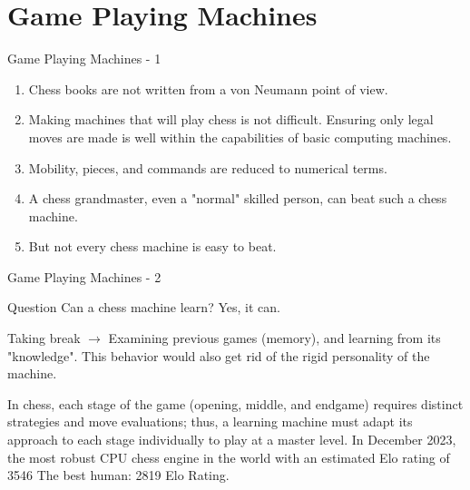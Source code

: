 \documentclass[xetex,notheorems,hyperref={pdfpagelabels=true},xcolor=table]{beamer}
\theoremstyle{plain}
\theoremstyle{definition}
\theoremstyle{example}
\theoremstyle{example}
\begin{document}
\section{Game Playing Machines}
\begin{frame}{Game Playing Machines - 1}
\begin{enumerate}[\indent $\square$]
    \item Chess books are not written from a von Neumann point of view.
    \item Making machines that will play chess is not difficult. Ensuring only legal moves are made is well within the capabilities of basic computing machines.
    \item Mobility, pieces, and commands are reduced to numerical terms.
    \item A chess grandmaster, even a "normal" skilled person, can beat such a chess machine. 
    \item But not every chess machine is easy to beat. 
\end{enumerate} 
\end{frame}

\begin{frame}{Game Playing Machines - 2}
\begin{block}{Question}
Can a chess machine learn? Yes, it can.
\end{block}
Taking break $\rightarrow$ Examining previous games (memory), and learning from its "knowledge".\vspace*{0.15cm}\newline
This behavior would also get rid of the rigid personality of the machine.\vspace*{0.15cm}\newline

In chess, each stage of the game (opening, middle, and endgame) requires distinct strategies and move evaluations; thus, a learning machine must adapt its approach to each stage individually to play at a master level.
\vspace*{0.25cm}\newline
In December 2023, the most robust CPU chess engine in the world with an estimated Elo rating of 3546\vspace*{0.25cm}\newline
The best human: 2819 Elo Rating.
\end{frame}
\end{document}
